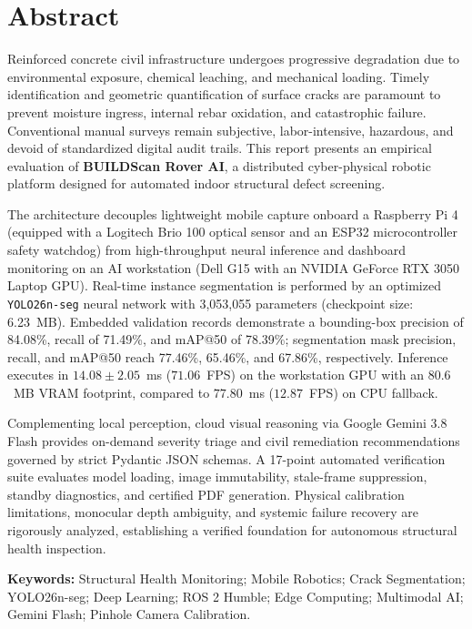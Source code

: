 \documentclass[12pt,a4paper,oneside]{report}
\begin{document}
\chapter*{Abstract}
Reinforced concrete civil infrastructure undergoes progressive degradation due to environmental exposure, chemical leaching, and mechanical loading. Timely identification and geometric quantification of surface cracks are paramount to prevent moisture ingress, internal rebar oxidation, and catastrophic failure. Conventional manual surveys remain subjective, labor-intensive, hazardous, and devoid of standardized digital audit trails. This report presents an empirical evaluation of \textbf{BUILDScan Rover AI}, a distributed cyber-physical robotic platform designed for automated indoor structural defect screening.

The architecture decouples lightweight mobile capture onboard a Raspberry Pi 4 (equipped with a Logitech Brio 100 optical sensor and an ESP32 microcontroller safety watchdog) from high-throughput neural inference and dashboard monitoring on an AI workstation (Dell G15 with an NVIDIA GeForce RTX 3050 Laptop GPU). Real-time instance segmentation is performed by an optimized \texttt{YOLO26n-seg} neural network with 3,053,055 parameters (checkpoint size: 6.23~MB). Embedded validation records demonstrate a bounding-box precision of 84.08\%, recall of 71.49\%, and mAP@50 of 78.39\%; segmentation mask precision, recall, and mAP@50 reach 77.46\%, 65.46\%, and 67.86\%, respectively. Inference executes in $14.08 \pm 2.05$~ms ($71.06$~FPS) on the workstation GPU with an $80.6$~MB VRAM footprint, compared to $77.80$~ms ($12.87$~FPS) on CPU fallback.

Complementing local perception, cloud visual reasoning via Google Gemini 3.8 Flash provides on-demand severity triage and civil remediation recommendations governed by strict Pydantic JSON schemas. A 17-point automated verification suite evaluates model loading, image immutability, stale-frame suppression, standby diagnostics, and certified PDF generation. Physical calibration limitations, monocular depth ambiguity, and systemic failure recovery are rigorously analyzed, establishing a verified foundation for autonomous structural health inspection.

\vspace{0.4cm}
\noindent\textbf{Keywords:} Structural Health Monitoring; Mobile Robotics; Crack Segmentation; YOLO26n-seg; Deep Learning; ROS 2 Humble; Edge Computing; Multimodal AI; Gemini Flash; Pinhole Camera Calibration.
\end{document}
